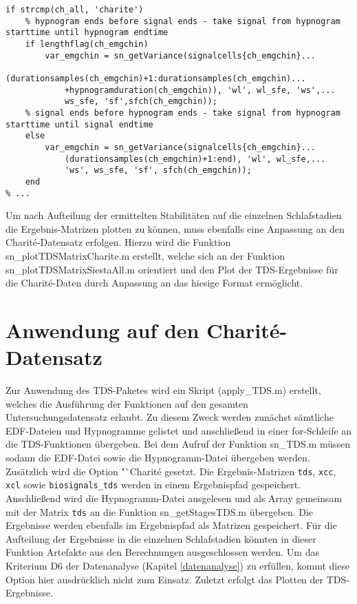 \begin{lstlisting}[caption={Berechnung der Zeitreihen für den Charit\'{e}-Datensatz in der Funktion sn\_TDS.m}, label={lst:zeitreihen}]
% ...
if strcmp(ch_all, 'charite')
    % hypnogram ends before signal ends - take signal from hypnogram starttime until hypnogram endtime
    if lengthflag(ch_emgchin)
        var_emgchin = sn_getVariance(signalcells{ch_emgchin}...
            (durationsamples(ch_emgchin)+1:durationsamples(ch_emgchin)...
            +hypnogramduration(ch_emgchin)), 'wl', wl_sfe, 'ws',...
            ws_sfe, 'sf',sfch(ch_emgchin));
    % signal ends before hypnogram ends - take signal from hypnogram starttime until signal endtime    
    else
        var_emgchin = sn_getVariance(signalcells{ch_emgchin}...
            (durationsamples(ch_emgchin)+1:end), 'wl', wl_sfe,...
            'ws', ws_sfe, 'sf', sfch(ch_emgchin));
    end
% ...
\end{lstlisting}

Um nach Aufteilung der ermittelten Stabilitäten auf die einzelnen Schlafstadien die Ergebnis-Matrizen plotten zu können, muss ebenfalls eine Anpassung an den Charit\'{e}-Datensatz erfolgen. Hierzu wird die Funktion sn\_plotTDSMatrixCharite.m erstellt, welche sich an der Funktion sn\_plotTDSMatrixSiestaAll.m orientiert und den Plot der \acs{TDS}-Ergebnisse für die Charit\'{e}-Daten durch Anpassung an das hiesige Format ermöglicht.

\section{Anwendung auf den Charit\'{e}-Datensatz}

Zur Anwendung des \acs{TDS}-Paketes wird ein Skript (apply\_TDS.m) erstellt, welches die Ausführung der Funktionen auf den gesamten Untersuchungsdatensatz erlaubt. Zu diesem Zweck werden zunächst sämtliche \acs{EDF}-Dateien und Hypnogramme gelistet und anschließend in einer for-Schleife an die \acs{TDS}-Funktionen übergeben. Bei dem Aufruf der Funktion sn\_TDS.m müssen sodann die \acs{EDF}-Datei sowie die Hypnogramm-Datei übergeben werden. Zusätzlich wird die Option "`Charit\'{e} gesetzt. Die Ergebnis-Matrizen \texttt{tds}, \texttt{xcc}, \texttt{xcl} sowie \texttt{biosignals\_tds} werden in einem Ergebnispfad gespeichert. Anschließend wird die Hypnogramm-Datei ausgelesen und als Array gemeinsam mit der Matrix \texttt{tds} an die Funktion sn\_getStagesTDS.m übergeben. Die Ergebnisse werden ebenfalls im Ergebnispfad als Matrizen gespeichert. Für die Aufteilung der Ergebnisse in die einzelnen Schlafstadien könnten in dieser Funktion Artefakte aus den Berechnungen ausgeschlossen werden. Um das Kriterium D6 der Datenanalyse (Kapitel \ref{datenanalyse}) zu erfüllen, kommt diese Option hier ausdrücklich nicht zum Einsatz. Zuletzt erfolgt das Plotten der \acs{TDS}-Ergebnisse.\\

